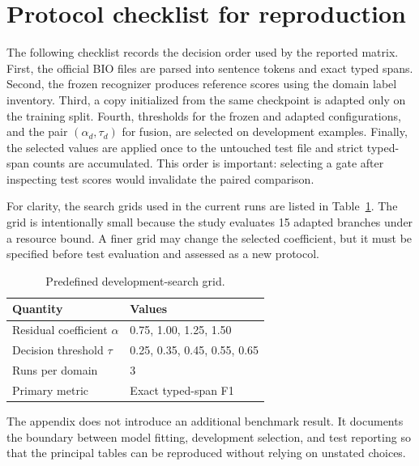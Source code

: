 \documentclass[a4paper,fleqn,numbers,doubleblind]{cas-dc}
\begin{document}
\appendix
\section{Protocol checklist for reproduction}
The following checklist records the decision order used by the reported matrix. First, the official BIO files are parsed into sentence tokens and exact typed spans. Second, the frozen recognizer produces reference scores using the domain label inventory. Third, a copy initialized from the same checkpoint is adapted only on the training split. Fourth, thresholds for the frozen and adapted configurations, and the pair $(\alpha_d,\tau_d)$ for fusion, are selected on development examples. Finally, the selected values are applied once to the untouched test file and strict typed-span counts are accumulated. This order is important: selecting a gate after inspecting test scores would invalidate the paired comparison.

For clarity, the search grids used in the current runs are listed in Table~\ref{tab:grid}. The grid is intentionally small because the study evaluates 15 adapted branches under a resource bound. A finer grid may change the selected coefficient, but it must be specified before test evaluation and assessed as a new protocol.

\begin{table}[t]
\centering
\caption{Predefined development-search grid.}
\label{tab:grid}
\begin{tabular}{ll}
\toprule
Quantity & Values\\
\midrule
Residual coefficient $\alpha$ & 0.75, 1.00, 1.25, 1.50\\
Decision threshold $\tau$ & 0.25, 0.35, 0.45, 0.55, 0.65\\
Runs per domain & 3\\
Primary metric & Exact typed-span F1\\
\bottomrule
\end{tabular}
\end{table}

The appendix does not introduce an additional benchmark result. It documents the boundary between model fitting, development selection, and test reporting so that the principal tables can be reproduced without relying on unstated choices.



\end{document}
